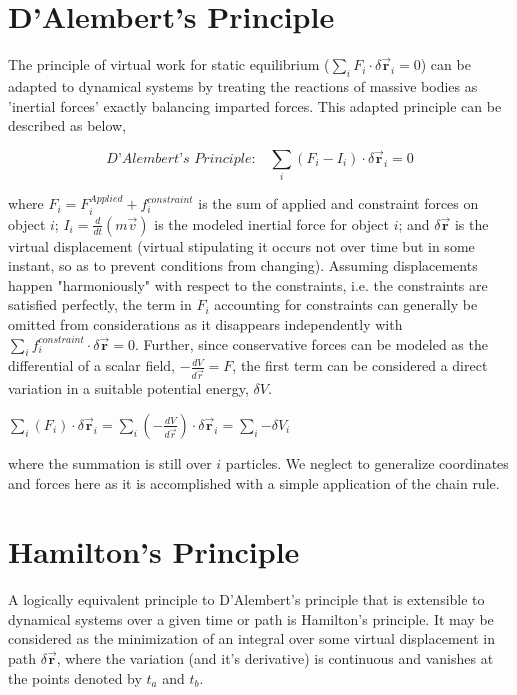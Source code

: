 \documentclass{article}\usepackage[]{graphicx}\usepackage[]{color}
\begin{document}
\section{D'Alembert's Principle}

The principle of virtual work for static equilibrium ($\sum_i{F_i\cdot \delta \vec{\textbf{r}}_i}=0$) can be adapted to dynamical systems by treating the reactions of massive bodies as 'inertial forces' exactly balancing imparted forces. This adapted principle can be described as below,

\begin{equation}
\textit{D'Alembert's Principle:} \quad \sum_{i}{(F_{i}-I_{i})\cdot\delta \vec{\textbf{r}}_{i}}=0 
\end{equation}

where $F_i=F^{Applied}_i+f^{constraint}_{i}$ is the sum of applied and constraint forces on object $i$; $I_i=\frac{d}{dt}(m\vec{v})$ is the modeled inertial force for object $i$; and $\delta \vec{\textbf{r}}$ is the virtual displacement (virtual stipulating it occurs not over time but in some instant, so as to prevent conditions from changing). Assuming displacements happen "harmoniously" with respect to the constraints, i.e. the constraints are satisfied perfectly, the term in $F_i$ accounting for constraints can generally be omitted from considerations as it disappears independently with $\sum_i{f^{constraint}_i}\cdot\delta\vec{\textbf{r}}=0$. Further, since conservative forces can be modeled as the differential of a scalar field, $-\frac{dV}{d\vec{r}}=F$, the first term can be considered a direct variation in a suitable potential energy, $\delta V$.

\begin{center}
$\sum_{i}{(F_{i})\cdot\delta \vec{\textbf{r}}_{i}}=\sum_{i}{(-\frac{dV}{d\vec{r}})\cdot\delta \vec{\textbf{r}}_{i}}=\sum_{i}{-\delta V_i}$
\end{center}

where the summation is still over $i$ particles. We neglect to generalize coordinates and forces here as it is accomplished with a simple application of the chain rule.

\section{Hamilton's Principle}

A logically equivalent principle to D'Alembert's principle that is extensible to dynamical systems over a given time or path is Hamilton's principle. It may be considered as the minimization of an integral over some virtual displacement in path $\delta\vec{\textbf{r}}$, where the variation (and it's derivative) is continuous and vanishes at the points denoted by $t_a$ and $t_b$.
\end{document}
